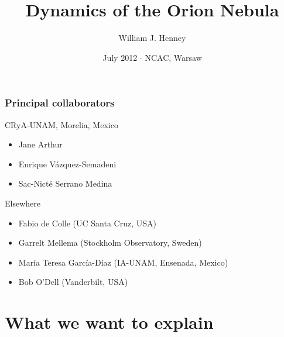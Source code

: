 \documentclass[presentation]{beamer}
\title{Dynamics of the Orion Nebula}
\author{William J. Henney}
\date[Warsaw 2012]{July 2012 \(\cdot\) NCAC, Warsaw}
\institute[CRyA, UNAM]
{
  \structure{Centro de Radioastronomía y Astrofísica\\
  UNAM, Morelia, México}
}
\begin{document}
\maketitle

\begin{frame}
\frametitle{Principal collaborators}

\begin{block}{CRyA-UNAM, Morelia, Mexico}
\begin{itemize}
\item Jane Arthur
\item Enrique Vázquez-Semadeni
\item Sac-Nicté Serrano Medina
\end{itemize}
\end{block}

\begin{block}{Elsewhere}
  \begin{itemize}
  \item Fabio de Colle (UC Santa Cruz, USA)
  \item Garrelt Mellema (Stockholm Observatory, Sweden)
  \item María Teresa García-Díaz (IA-UNAM, Ensenada, Mexico)
  \item Bob O'Dell (Vanderbilt, USA)
  \end{itemize}
\end{block}

\end{frame}








\section{What we want to explain}
\end{document}
